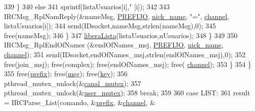 \begin{DoxyCode}
{{{339                                                         \}
340                                                         \textcolor{keywordflow}{else}
341                                                                 sprintf(listaUsuarios[i],\textcolor{stringliteral}{"%
      [i]);
342 
343                                                         IRCMsg\_RplNamReply(&nameMsg,
      \hyperlink{_g-2361-06-_p1-_server_8h_a78c658ff923693099f7b621e7c351129}{PREFIJO}, \hyperlink{_g-2361-06-_p1-_server_8c_aabbf66718cda228b924a4a9441eadf62}{nick\_name}, \textcolor{stringliteral}{"="}, \hyperlink{_g-2361-06-_p1-_server_8c_a842ca2f026578e5c479c095ff3335969}{channel}, listaUsuarios[i]);
344                                                         send(IDsocket,nameMsg,strlen(nameMsg),0);
345                                                         free(nameMsg); 
346                                                 \}       
347                                                 \hyperlink{_g-2361-06-_p1-_functions_8h_a5fa63429b3483f20a469c23625c96820}{liberaLista}(listaUsuarios,nUsuarios);                        
348                                         \}       
349 
350                                         IRCMsg\_RplEndOfNames (&endOfNames\_msj, 
      \hyperlink{_g-2361-06-_p1-_server_8h_a78c658ff923693099f7b621e7c351129}{PREFIJO}, \hyperlink{_g-2361-06-_p1-_server_8c_aabbf66718cda228b924a4a9441eadf62}{nick\_name}, \hyperlink{_g-2361-06-_p1-_server_8c_a842ca2f026578e5c479c095ff3335969}{channel});
351                                         send(IDsocket,endOfNames\_msj,strlen(endOfNames\_msj),0);
352                                         free(join\_msj); free(complex); free(endOfNames\_msj); free(
      \hyperlink{_g-2361-06-_p1-_server_8c_a842ca2f026578e5c479c095ff3335969}{channel});
353                                 \}
354                         \}
355                         free(\hyperlink{_g-2361-06-_p1-_server_8c_ad2849cf781a4db22cc1b31eaaee50a4f}{prefix}); free(\hyperlink{_g-2361-06-_p1-_server_8c_a32d2f5216cddb59c7cc8fb2806a7e727}{msg}); free(\hyperlink{_g-2361-06-_p1-_server_8c_a5892a9181e6a332f84d27aecd41dcd12}{key});
356                         pthread\_mutex\_unlock(&\hyperlink{_g-2361-06-_p1-_server_8c_ab86a544a49de18195048bac54dd3ac3e}{canal\_mutex});
357                         pthread\_mutex\_unlock(&\hyperlink{_g-2361-06-_p1-_server_8c_a5dedd07a1144d2ab70b74a8e64b6a7c0}{user\_mutex});
358                         \textcolor{keywordflow}{break};
359 
360                 \textcolor{keywordflow}{case} LIST:
361                         result = IRCParse\_List(comando, &\hyperlink{_g-2361-06-_p1-_server_8c_ad2849cf781a4db22cc1b31eaaee50a4f}{prefix}, &\hyperlink{_g-2361-06-_p1-_server_8c_a842ca2f026578e5c479c095ff3335969}{channel}, &
}}}}
\end{DoxyCode}
